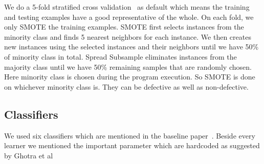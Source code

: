 \documentclass[conference]{IEEEtran}
\begin{document}
We do a 5-fold stratified cross validation~\cite{refaeilzadeh2009cross} as default which means the training and testing examples have a good representative of the whole. On each fold, we only SMOTE the training examples. SMOTE first selects instances from the minority class and finds 5 nearest neighbors for each instance. We then creates new instances using the selected instances and their neighbors until we have 50\% of minority class in total. Spread Subsample eliminates instances from the majority class until we have 50\% remaining samples that are randomly chosen. Here minority class is chosen during the program execution. So SMOTE is done on whichever minority class is. They can be defective as well as non-defective.

\subsection{\textbf{Classifiers}}
We used six classifiers which are mentioned in the baseline paper~\cite{ghotra2015revisiting}. Beside every learner we mentioned the important parameter which are hardcoded as suggested by Ghotra et al
\end{document}
